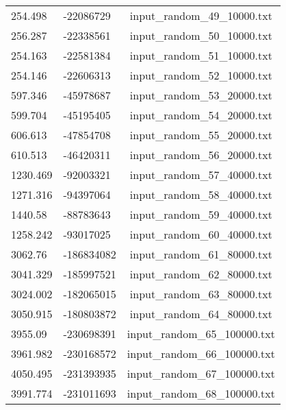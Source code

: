 \begin{longtable}[hb]{|l|l|c|}
    254.498 & -22086729 & input\_random\_49\_10000.txt \\
    256.287 & -22338561 & input\_random\_50\_10000.txt \\
    254.163 & -22581384 & input\_random\_51\_10000.txt \\
    254.146 & -22606313 & input\_random\_52\_10000.txt \\
    597.346 & -45978687 & input\_random\_53\_20000.txt \\
    599.704 & -45195405 & input\_random\_54\_20000.txt \\
    606.613 & -47854708 & input\_random\_55\_20000.txt \\
    610.513 & -46420311 & input\_random\_56\_20000.txt \\
    1230.469 & -92003321 & input\_random\_57\_40000.txt \\
    1271.316 & -94397064 & input\_random\_58\_40000.txt \\
    1440.58 & -88783643 & input\_random\_59\_40000.txt \\
    1258.242 & -93017025 & input\_random\_60\_40000.txt \\
    3062.76 & -186834082 & input\_random\_61\_80000.txt \\
    3041.329 & -185997521 & input\_random\_62\_80000.txt \\
    3024.002 & -182065015 & input\_random\_63\_80000.txt \\
    3050.915 & -180803872 & input\_random\_64\_80000.txt \\
    3955.09 & -230698391 & input\_random\_65\_100000.txt \\
    3961.982 & -230168572 & input\_random\_66\_100000.txt \\
    4050.495 & -231393935 & input\_random\_67\_100000.txt \\
    3991.774 & -231011693 & input\_random\_68\_100000.txt \\
    \hline
\end{longtable}